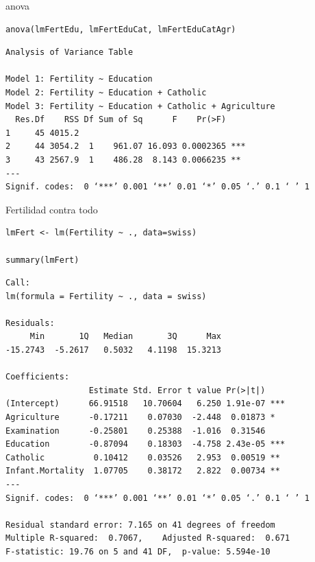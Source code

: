 \documentclass[xcolor={usenames,svgnames,dvipsnames}]{beamer}
\begin{document}
\begin{frame}[fragile,label=sec-3-8]{anova}
 \lstset{language=R,numbers=none}
\begin{lstlisting}
anova(lmFertEdu, lmFertEduCat, lmFertEduCatAgr)
\end{lstlisting}

\begin{verbatim}
Analysis of Variance Table

Model 1: Fertility ~ Education
Model 2: Fertility ~ Education + Catholic
Model 3: Fertility ~ Education + Catholic + Agriculture
  Res.Df    RSS Df Sum of Sq      F    Pr(>F)    
1     45 4015.2                                  
2     44 3054.2  1    961.07 16.093 0.0002365 ***
3     43 2567.9  1    486.28  8.143 0.0066235 ** 
---
Signif. codes:  0 ‘***’ 0.001 ‘**’ 0.01 ‘*’ 0.05 ‘.’ 0.1 ‘ ’ 1
\end{verbatim}
\end{frame}
\begin{frame}[fragile,label=sec-3-9]{Fertilidad contra todo}
 \lstset{language=R,numbers=none}
\begin{lstlisting}
lmFert <- lm(Fertility ~ ., data=swiss)

summary(lmFert)
\end{lstlisting}

\begin{verbatim}
Call:
lm(formula = Fertility ~ ., data = swiss)

Residuals:
     Min       1Q   Median       3Q      Max 
-15.2743  -5.2617   0.5032   4.1198  15.3213 

Coefficients:
                 Estimate Std. Error t value Pr(>|t|)    
(Intercept)      66.91518   10.70604   6.250 1.91e-07 ***
Agriculture      -0.17211    0.07030  -2.448  0.01873 *  
Examination      -0.25801    0.25388  -1.016  0.31546    
Education        -0.87094    0.18303  -4.758 2.43e-05 ***
Catholic          0.10412    0.03526   2.953  0.00519 ** 
Infant.Mortality  1.07705    0.38172   2.822  0.00734 ** 
---
Signif. codes:  0 ‘***’ 0.001 ‘**’ 0.01 ‘*’ 0.05 ‘.’ 0.1 ‘ ’ 1

Residual standard error: 7.165 on 41 degrees of freedom
Multiple R-squared:  0.7067,	Adjusted R-squared:  0.671 
F-statistic: 19.76 on 5 and 41 DF,  p-value: 5.594e-10
\end{verbatim}
\end{frame}
\end{document}
